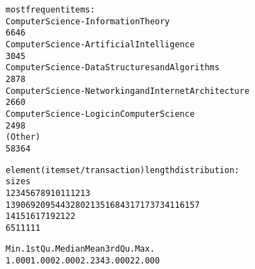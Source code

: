 \begin{alltt}\tiny
most frequent items:
                  Computer Science - Information Theory
                                                   6646
             Computer Science - Artificial Intelligence
                                                   3045
      Computer Science - Data Structures and Algorithms
                                                   2878
Computer Science - Networking and Internet Architecture
                                                   2660
           Computer Science - Logic in Computer Science
                                                   2498
                                                (Other)
                                                  58364

element (itemset/transaction) length distribution:
sizes
    1     2     3     4     5     6     7     8     9    10    11    12    13
13906  9209  5443  2802  1351   684   317   173    73    41    16    15     7
   14    15    16    17    19    21    22
    6     5     1     1     1     1     1

   Min. 1st Qu.  Median    Mean 3rd Qu.    Max.
  1.000   1.000   2.000   2.234   3.000  22.000

\end{alltt}
